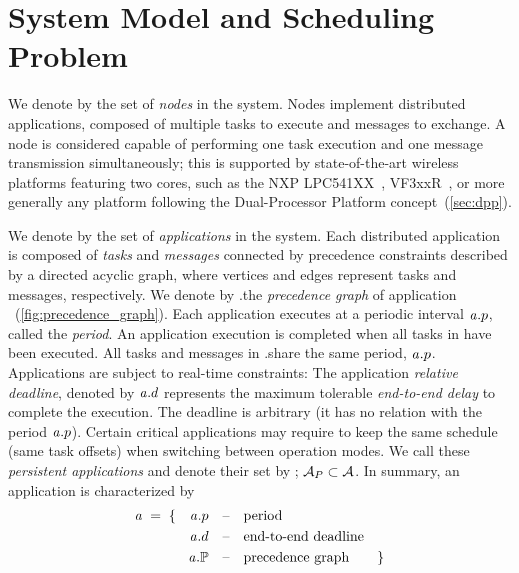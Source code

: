 
\section{System Model and Scheduling Problem}
\label{sec:model}

We denote by \nodeset the set of \emph{nodes} in the system.
Nodes implement distributed applications, composed of multiple tasks to execute and  messages to exchange.
A node is considered capable of performing one task execution and one message transmission simultaneously; this is supported by state-of-the-art wireless \cps platforms featuring two cores, such as the NXP LPC541XX~\cite{nxpLPC541XX}, VF3xxR~\cite{nxpVF3xxR}, or more generally any platform following the Dual-Processor Platform concept~(\cref{sec:dpp}).

We denote by \appset the set of \emph{applications} in the system.
Each distributed application is composed of \emph{tasks} and \emph{messages} connected by precedence constraints described by a directed acyclic graph, where vertices and edges represent tasks and messages, respectively. We denote by \app.\predG the \emph{precedence graph} of application \app~(\cref{fig:precedence_graph}).
Each application executes at a periodic interval $\mathit{a_{}}.p$, called the \emph{period}.
An application execution is completed when all tasks in \predG have been executed.
All tasks and messages in \app.\predG share the same period, $\mathit{a_{}}.p$.
Applications are subject to real-time constraints: The application \emph{relative deadline}, denoted by $\mathit{a_{}}.d$ represents the maximum tolerable \emph{end-to-end delay} to complete the execution. The deadline is arbitrary (\ie it has no relation with the period $\mathit{a_{}}.p$).
Certain critical applications may require to keep the same schedule (\eg same task offsets) when switching between operation modes.
We call these \emph{persistent applications} and denote their set by \persappset; $\mathcal{A}_{P} \subset \mathcal{A}$.
In summary, an application \app is characterized by
\begin{align*}
\mathit{a_{}} \; = \; \{ \quad
	 \mathit{a_{}}.p
	\quad &\text{--\quad period} \\
	 \mathit{a_{}}.d
	\quad &\text{--\quad end-to-end deadline} \\
	 \mathit{a_{}}.\mathbb{P}
	\quad &\text{--\quad precedence graph} \quad\quad \}
\end{align*}

